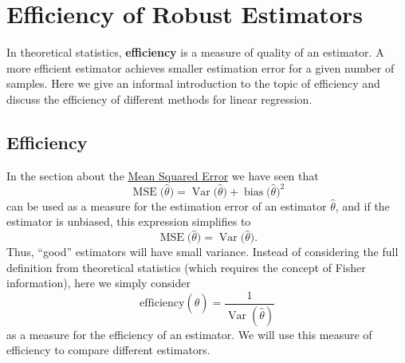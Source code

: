 \documentclass[
  a4paper,
]{article}
\theoremstyle{definition}
\theoremstyle{definition}
\theoremstyle{definition}
\theoremstyle{definition}
\theoremstyle{remark}
\begin{document}
\clearpage

\hypertarget{S19-efficiency}{%
\section{Efficiency of Robust Estimators}\label{S19-efficiency}}

In theoretical statistics, \textbf{efficiency} is a measure of quality of an
estimator. A more efficient estimator achieves smaller estimation error
for a given number of samples. Here we give an informal introduction
to the topic of efficiency and discuss the efficiency of different
methods for linear regression.

\hypertarget{efficiency}{%
\subsection{Efficiency}\label{efficiency}}

In the section about the \protect\hyperlink{mean-squared-error}{Mean Squared Error} we have seen that
\begin{equation*}
  \mathop{\mathrm{MSE}}\nolimits\bigl( \hat\theta \bigr)
  = \mathop{\mathrm{Var}}\bigl( \hat\theta \bigr) + \mathop{\mathrm{bias}}\bigl( \hat\theta \bigr)^2
\end{equation*}
can be used as a measure for the estimation error of an estimator \(\hat\theta\),
and if the estimator is unbiased, this expression simplifies to
\begin{equation*}
  \mathop{\mathrm{MSE}}\nolimits\bigl( \hat\theta \bigr)
  = \mathop{\mathrm{Var}}\bigl( \hat\theta \bigr).
\end{equation*}
Thus, ``good'' estimators will have small variance.
Instead of considering the full definition from theoretical statistics
(which requires the concept of Fisher information), here we simply consider
\begin{equation*}
  \mathrm{efficiency}(\hat\theta)
  = \frac{1}{\mathop{\mathrm{Var}}(\hat\theta)}
\end{equation*}
as a measure for the efficiency of an estimator. We will use this measure
of efficiency to compare different estimators.
\end{document}
